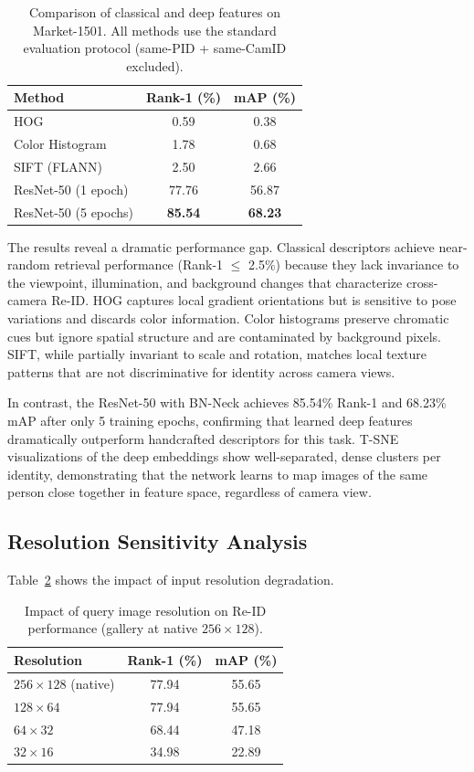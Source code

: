 \documentclass[final]{cvpr}
\begin{document}
\begin{table}[h]
\centering
\caption{Comparison of classical and deep features on Market-1501. All methods use the standard evaluation protocol (same-PID + same-CamID excluded).}
\label{tab:classical_vs_deep}
\begin{tabular}{lcc}
\toprule
\textbf{Method} & \textbf{Rank-1 (\%)} & \textbf{mAP (\%)} \\
\midrule
HOG             & 0.59 & 0.38 \\
Color Histogram & 1.78 & 0.68 \\
SIFT (FLANN)    & 2.50 & 2.66 \\
\midrule
ResNet-50 (1 epoch) & 77.76 & 56.87 \\
ResNet-50 (5 epochs) & \textbf{85.54} & \textbf{68.23} \\
\bottomrule
\end{tabular}
\end{table}

The results reveal a dramatic performance gap.
Classical descriptors achieve near-random retrieval performance (Rank-1 $\leq$ 2.5\%) because they lack invariance to the viewpoint, illumination, and background changes that characterize cross-camera Re-ID.
HOG captures local gradient orientations but is sensitive to pose variations and discards color information.
Color histograms preserve chromatic cues but ignore spatial structure and are contaminated by background pixels.
SIFT, while partially invariant to scale and rotation, matches local texture patterns that are not discriminative for identity across camera views.

In contrast, the ResNet-50 with BN-Neck achieves 85.54\% Rank-1 and 68.23\% mAP after only 5 training epochs, confirming that learned deep features dramatically outperform handcrafted descriptors for this task.
T-SNE visualizations of the deep embeddings show well-separated, dense clusters per identity, demonstrating that the network learns to map images of the same person close together in feature space, regardless of camera view.

\subsection{Resolution Sensitivity Analysis}

Table~\ref{tab:resolution} shows the impact of input resolution degradation.

\begin{table}[h]
\centering
\caption{Impact of query image resolution on Re-ID performance (gallery at native $256 \times 128$).}
\label{tab:resolution}
\begin{tabular}{lcc}
\toprule
\textbf{Resolution} & \textbf{Rank-1 (\%)} & \textbf{mAP (\%)} \\
\midrule
$256 \times 128$ (native) & 77.94 & 55.65 \\
$128 \times 64$          & 77.94 & 55.65 \\
$64 \times 32$           & 68.44 & 47.18 \\
$32 \times 16$           & 34.98 & 22.89 \\
\bottomrule
\end{tabular}
\end{table}
\end{document}
